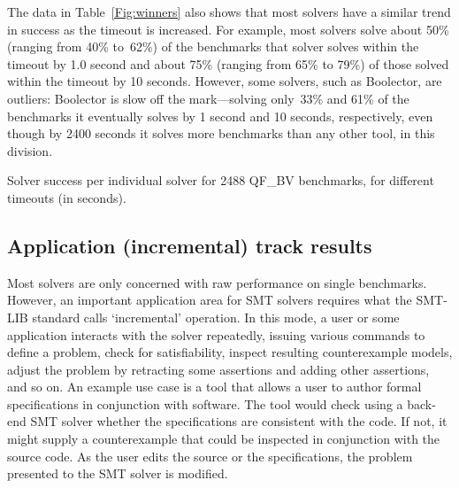 \documentclass[twoside,11pt]{article}
\begin{document}
The data in Table~\ref{Fig:winners} also shows that most solvers have a similar trend in success as the timeout is increased. For example, most solvers solve about 50\% (ranging from 40\% to~62\%) of the benchmarks that solver solves within the timeout by 1.0 second and
about 75\% (ranging from 65\% to 79\%) of those solved within the timeout by 10 seconds. However, some solvers, such as Boolector, are outliers: Boolector is slow off the mark---solving only~33\% and 61\% of the benchmarks it eventually solves
by 1 second and 10 seconds, respectively, even though by 2400 seconds it solves more benchmarks than any other tool, in this division.


\begin{table}
\caption{Solver success per individual solver for 2488 QF\_BV benchmarks, for different timeouts (in seconds).}
\label{Fig:winners}
\centering

\end{table}

\subsection{Application (incremental) track results}
\label{sec:application-results}

Most solvers are only concerned with raw performance on single benchmarks. However, an important application area for SMT solvers requires what the SMT-LIB standard calls `incremental' operation.
In this mode, a user or some application interacts with the solver repeatedly, issuing various commands to define a problem, check for satisfiability, inspect resulting counterexample models, adjust the problem by retracting some assertions and adding other assertions, and so on. An example use case is a tool that allows a user to author formal specifications in conjunction with software. The tool would
check using a back-end SMT solver whether the specifications are consistent with the code. If not, it might
supply a counterexample that could be inspected in conjunction with the source code. As the user edits the source or the specifications, the problem presented to the SMT solver is modified.
\end{document}
